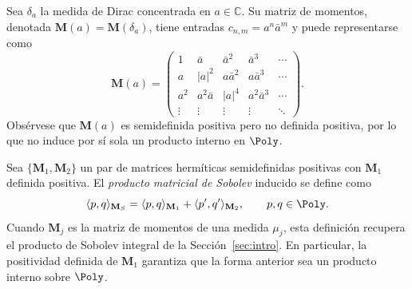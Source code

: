 \begin{defn}\label{def:matriz_dirac}
	Sea $\delta_a$ la medida de Dirac concentrada en $a \in \mathbb{C}$. Su matriz de momentos, denotada $\mathbf{M}(a) = \mathbf{M}(\delta_a)$, tiene entradas $c_{n,m} = a^n \bar{a}^m$ y puede representarse como
	\[
		\mathbf{M}(a) = \begin{pmatrix}
			1      & \bar{a}    & \bar{a}^2  & \bar{a}^3    & \cdots \\
			a      & |a|^2      & a\bar{a}^2 & a\bar{a}^3   & \cdots \\
			a^2    & a^2\bar{a} & |a|^4      & a^2\bar{a}^3 & \cdots \\
			\vdots & \vdots     & \vdots     & \vdots       & \ddots
		\end{pmatrix}.
	\]
	Obsérvese que $\mathbf{M}(a)$ es semidefinida positiva pero no definida positiva, por lo que no induce por sí sola un producto interno en $\Poly$.
\end{defn}

\begin{defn}\label{def:producto_sobolev_matricial}
	Sea $\{\mathbf{M}_1, \mathbf{M}_2\}$ un par de matrices hermíticas semidefinidas positivas con $\mathbf{M}_1$ definida positiva. El \emph{producto matricial de Sobolev} inducido se define como
	\[
		\langle p, q \rangle_{\mathbf{M}_S} = \langle p, q \rangle_{\mathbf{M}_1} + \langle p', q' \rangle_{\mathbf{M}_2}, \qquad p, q \in \Poly.
	\]
	Cuando $\mathbf{M}_j$ es la matriz de momentos de una medida $\mu_j$, esta definición recupera el producto de Sobolev integral de la Sección~\ref{sec:intro}. En particular, la positividad definida de $\mathbf{M}_1$ garantiza que la forma anterior sea un producto interno sobre $\Poly$.
\end{defn}

